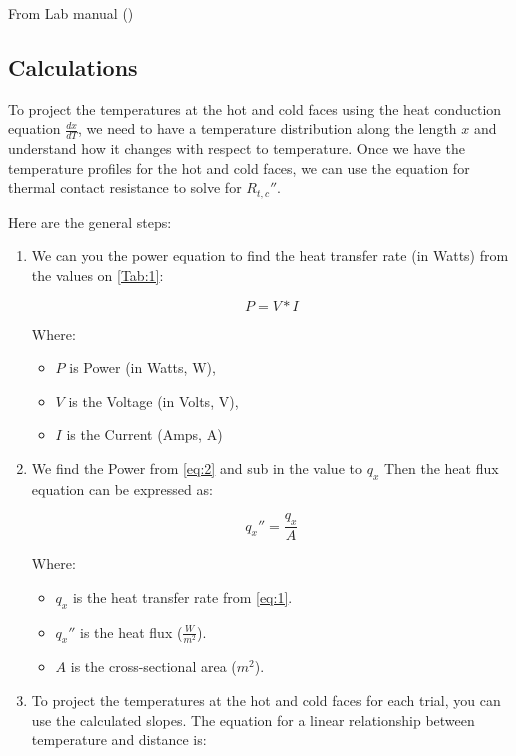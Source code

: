 \documentclass[10pt,twocolumn]{article}
\begin{document}
From Lab manual (\citeauthor{Wickett})


\subsection{Calculations}
\label{sec:calculations}

To project the temperatures at the hot and cold faces using the heat conduction equation $\frac{dx}{dT}$, we need to have a temperature distribution along the length $x$ and understand how it changes with respect to temperature. Once we have the temperature profiles for the hot and cold faces, we can use the equation for thermal contact resistance to solve for $R_{t,c}''$.

Here are the general steps:
\begin{enumerate}

\item We can you the power equation to find the heat transfer rate (in Watts) from the values on \autoref{Tab:1}:

\begin{equation}
P = V * I
\label{eq:1}
\end{equation}

Where:
\begin{itemize}
  \item $P$ is Power (in Watts, W),
  \item $V$ is the Voltage (in Volts, V),
  \item $I$ is the Current (Amps, A) 
\end{itemize}

  \item We find the Power from \autoref{eq:2} and sub in the value to $q_x$ Then the heat flux equation can be expressed as:

\begin{equation}
\label{eq:2}
q_x'' = \frac{q_x}{A}
\end{equation}

Where:
\begin{itemize}
 \item $q_x$ is the heat transfer rate from \autoref{eq:1}.
 \item $q_x''$ is the heat flux ($\frac{W}{m^2}$).
 \item $A$ is the cross-sectional area ($m^2$).
\end{itemize}


\item To project the temperatures at the hot and cold faces for each trial, you can use the calculated slopes. The equation for a linear relationship between temperature and distance is:


\end{enumerate}
\end{document}
